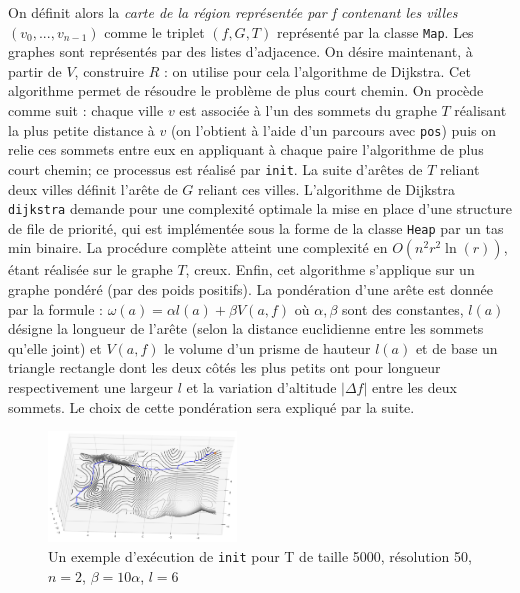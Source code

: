 \documentclass[french]{article}
\begin{document}
		On définit alors la \emph{carte de la région représentée par f contenant les villes $(v_{0},...,v_{n-1})$} comme le triplet $(f,G,T)$ représenté par la classe \verb?Map?. Les graphes sont représentés par des listes d'adjacence.
		\newline
		\newline
		On désire maintenant, à partir de $V$, construire $R$ : on utilise pour cela l'algorithme de Dijkstra. Cet algorithme permet de résoudre le problème de plus court chemin. On procède comme suit : chaque ville $v$ est associée à l'un des sommets du graphe $T$ réalisant la plus petite distance à $v$ (on l'obtient à l'aide d'un parcours avec \verb?pos?) puis on relie ces sommets entre eux en appliquant à chaque paire l'algorithme de plus court chemin; ce processus est réalisé par \verb?init?. La suite d'arêtes de $T$ reliant deux villes définit l'arête de $G$ reliant ces villes.\newline
		L'algorithme de Dijkstra \verb?dijkstra? demande pour une complexité optimale la mise en place d'une structure de file de priorité, qui est implémentée sous la forme de la classe \verb?Heap? par un tas min binaire. La procédure complète atteint une complexité en $O(n^{2}r^{2}\ln(r))$, étant réalisée sur le graphe $T$, creux. \newline
		Enfin, cet algorithme s'applique sur un graphe pondéré (par des poids positifs). La pondération d'une arête est donnée par la formule : $\omega(a) = \alpha l(a) + \beta V(a,f)$ où $\alpha, \beta$ sont des constantes, $l(a)$ désigne la longueur de l'arête (selon la distance euclidienne entre les sommets qu'elle joint) et $V(a,f)$ le volume d'un prisme de hauteur $l(a)$ et de base un triangle rectangle dont les deux côtés les plus petits ont pour longueur respectivement une largeur $l$ et la variation d'altitude $|\Delta f|$ entre les deux sommets. Le choix de cette pondération sera expliqué par la suite.

		\begin{figure}[h]
			\centering
			\includegraphics[width=5cm]{Pics/lacets.png}
			\caption{Un exemple d'exécution de \verb!init! pour T de taille 5000, résolution 50, $n = 2$, $\beta = 10 \alpha$, $l=6$}
		\end{figure}
\end{document}

